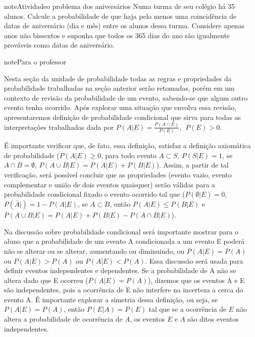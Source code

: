 \begin{sphinxadmonition}{note}{Atividade}{o problema dos aniversários}
Numa turma de seu colégio há 35 alunos. Calcule a probabilidade de que haja pelo menos uma coincidência de datas de aniversário (dia e mês) entre os alunos dessa turma. Considere apenas anos não bissextos e suponha que todos os 365 dias do ano são igualmente prováveis como datas de aniversário.
\label{\detokenize{PE511-5:id3}}
\begin{figure}[H]
\centering

\noindent{}
\label{\detokenize{PE511-5:id3}}\end{figure}
\end{sphinxadmonition}

\begin{sphinxadmonition}{note}{Para o professor}

Nesta seção da unidade de probabilidade todas as regras e propriedades da probabilidade trabalhadas na seção anterior serão retomadas, porém em um contexto de revisão da probabilidade de um evento, sabendo-se que algum outro evento tenha ocorrido. Após explorar uma situação que envolva essa revisão, apresentaremos definição de probabilidade condicional que sirva para todas as interpretações trabalhadas dada por \(P(A|E)=\frac{P(A\cap E)}{P(E)}, \ \ P(E)>0\).

É importante verificar que, de fato, essa definição, satisfaz a definição axiomática de probabilidade (\(P(A | E)\geq 0\), para todo evento \(A\subset S\), \(P(S | E)=1\), se \(A\cap B=∅\), \(P(A\cup B| E)=P(A| E)+P(B| E)\)). Assim, a partir de tal verificação, será possível concluir que as propriedades (evento vazio, evento complementar e união de dois eventos quaisquer) serão válidas para a probabilidade condicional fixado o evento ocorrido tal que (\(P(\emptyset| E)=0\), \(P( \bar{A}| )=1-P(A| E)\), se \(A\subset B\), então \(P(A| E)\leq P(B| E)\) e  \(P(A\cup B| E)=P(A| E)+P(B| E)-P(A\cap B| E)\)).

Na discussão sobre probabilidade condicional será importante mostrar para o aluno que a probabilidade de um evento A condicionada a um evento E poderá não se alterar ou se alterar, aumentando ou diminuindo, ou \(P(A| E)=P(A)\) ou \(P(A| E)>P(A)\) ou \(P(A| E)<P(A)\). Essa discussão será usada para definir eventos independentes e dependentes. Se a probabilidade de A não se altera dado que E ocorreu (\(P(A| E )=P(A)\)), dizemos que os eventos A e E são independentes, pois a ocorrência de E não interfere na incerteza a cerca do evento A. É importante explorar a simetria dessa definição, ou seja, se \(P(A| E)=P(A)\), então \(P(E| A)=P(E)\) tal que se a ocorrência de \(E\) não altera a probabilidade de ocorrência de \(A\), os eventos \(E\) e \(A\) são ditos eventos independentes.


\end{sphinxadmonition}
